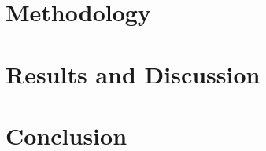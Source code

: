 \documentclass[12pt]{article}
\begin{document}
\cite{rian}


\section{Methodology} \label{sec:2}



\section{Results and Discussion} \label{sec:3}



\section{Conclusion} \label{sec:4}



\newpage



 \label{sec:ref}

\vspace{1.5cm}

\listoffigures
\end{document}
